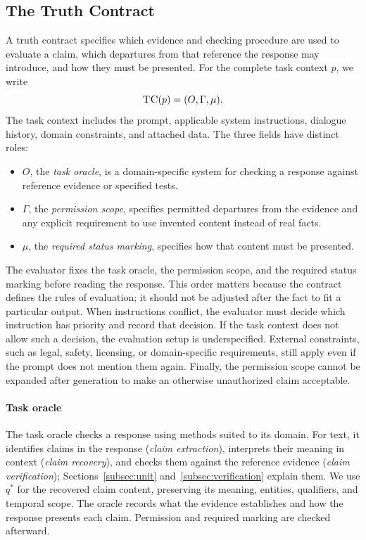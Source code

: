 \documentclass{clv2025}
\newcommand{\TC}{\textsc{TC}}
\begin{document}
\subsection{The Truth Contract}\label{subsec:contract}
A truth contract specifies which evidence and checking procedure are used to evaluate a claim, which departures from that
reference the response may introduce, and how they must be presented.
For the complete task context $p$, we write
\begin{equation}
\TC(p)=(O,\Gamma,\mu).
\label{eq:truth-contract}
\end{equation}
The task context includes the prompt, applicable system instructions, dialogue
history, domain constraints, and attached data. The three fields have distinct roles:
\begin{itemize}
\item $O$, the \emph{task oracle}, is a domain-specific system for checking a response against reference evidence or specified tests.
\item $\Gamma$, the \emph{permission scope}, specifies permitted departures from the evidence and any explicit requirement to use invented content instead of real facts.
\item $\mu$, the \emph{required status marking}, specifies how that content must be presented.
\end{itemize}
The evaluator fixes the task oracle, the permission scope, and the required status marking before reading the response. 
This order matters because the contract defines the rules of evaluation; 
it should not be adjusted after the fact to fit a particular output. 
When instructions conflict, the evaluator must decide which instruction has priority and record that decision. 
If the task context does not allow such a decision, the evaluation setup is underspecified. 
External constraints, such as legal, safety, licensing, or domain-specific requirements, 
still apply even if the prompt does not mention them again. 
Finally, the permission scope cannot be expanded after generation to make an otherwise unauthorized claim acceptable.

\paragraph{Task oracle}
The task oracle checks a response using methods suited to its domain. For
text, it identifies claims in the response (\emph{claim extraction}),
interprets their meaning in context (\emph{claim recovery}),
and checks them against the reference evidence (\emph{claim verification}); Sections~\ref{subsec:unit}
and~\ref{subsec:verification} explain them. We use $q^*$ for the recovered
claim content, preserving its meaning, entities, qualifiers, and temporal
scope. The oracle records what the evidence establishes and how the response
presents each claim. Permission and required marking are checked afterward.
\end{document}
